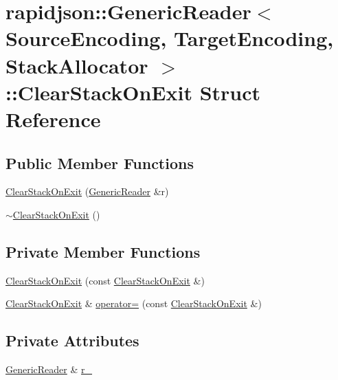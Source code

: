 \hypertarget{structrapidjson_1_1_generic_reader_1_1_clear_stack_on_exit}{}\section{rapidjson\+::Generic\+Reader$<$ Source\+Encoding, Target\+Encoding, Stack\+Allocator $>$\+::Clear\+Stack\+On\+Exit Struct Reference}
\label{structrapidjson_1_1_generic_reader_1_1_clear_stack_on_exit}
\subsection*{Public Member Functions}
\begin{DoxyCompactItemize}
\item 
\mbox{\hyperlink{structrapidjson_1_1_generic_reader_1_1_clear_stack_on_exit_a5f0b8a51390d177567d707890b781f0f}{Clear\+Stack\+On\+Exit}} (\mbox{\hyperlink{classrapidjson_1_1_generic_reader}{Generic\+Reader}} \&r)
\item 
\mbox{\hyperlink{structrapidjson_1_1_generic_reader_1_1_clear_stack_on_exit_a27b50fa8ea7500cf37e25f1c2b9719b1}{$\sim$\+Clear\+Stack\+On\+Exit}} ()
\end{DoxyCompactItemize}
\subsection*{Private Member Functions}
\begin{DoxyCompactItemize}
\item 
\mbox{\hyperlink{structrapidjson_1_1_generic_reader_1_1_clear_stack_on_exit_a7414572b9f82fbd937c83b71d69784f5}{Clear\+Stack\+On\+Exit}} (const \mbox{\hyperlink{structrapidjson_1_1_generic_reader_1_1_clear_stack_on_exit}{Clear\+Stack\+On\+Exit}} \&)
\item 
\mbox{\hyperlink{structrapidjson_1_1_generic_reader_1_1_clear_stack_on_exit}{Clear\+Stack\+On\+Exit}} \& \mbox{\hyperlink{structrapidjson_1_1_generic_reader_1_1_clear_stack_on_exit_a7d7c23188f019af93c24d46eec7500de}{operator=}} (const \mbox{\hyperlink{structrapidjson_1_1_generic_reader_1_1_clear_stack_on_exit}{Clear\+Stack\+On\+Exit}} \&)
\end{DoxyCompactItemize}
\subsection*{Private Attributes}
\begin{DoxyCompactItemize}
\item 
\mbox{\hyperlink{classrapidjson_1_1_generic_reader}{Generic\+Reader}} \& \mbox{\hyperlink{structrapidjson_1_1_generic_reader_1_1_clear_stack_on_exit_ad6a9442b2d01b5d2d23b354f30091ca7}{r\+\_\+}}
\end{DoxyCompactItemize}


